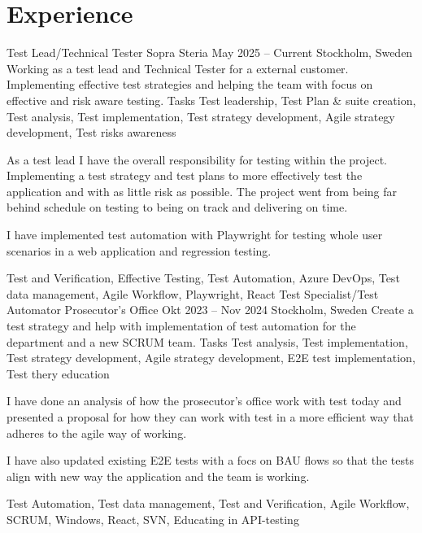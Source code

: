 \documentclass{sobCV}[2015/09/08]
\begin{document}
\section{Experience}

\experiencenode
{Test Lead/Technical Tester}
{Sopra Steria}
{May 2025 -- Current}
{Stockholm, Sweden}{
	Working as a test lead and Technical Tester for a external customer.
	Implementing effective test strategies and helping the team with focus
	on effective and risk aware testing.
}
{Tasks}{
	Test leadership,
	Test Plan \& suite creation,
	Test analysis,
	Test implementation,
	Test strategy development,
	Agile strategy development,
	Test risks awareness
}{  %
	{
		As a test lead I have the overall responsibility for testing within the
		project. Implementing a test strategy and test plans to more
		effectively test the application and with as little risk as possible.
		The project went from being far behind schedule on testing to being on
		track and delivering on time.

		I have implemented test automation with Playwright for testing whole
		user scenarios in a web application and regression testing.

	}
}{
	Test and Verification,
	Effective Testing,
	Test Automation,
	Azure DevOps,
	Test data management,
	Agile Workflow,
	Playwright,
	React
}
\experiencenode
{Test Specialist/Test Automator}
{Prosecutor's Office}
{Okt 2023 -- Nov 2024}
{Stockholm, Sweden}{
	Create a test strategy and help with implementation of test automation
	for the department and a new SCRUM team.
}
{Tasks}{
	Test analysis,
	Test implementation,
	Test strategy development,
	Agile strategy development,
	E2E test implementation,
	Test thery education
}{  %
	{
		I have done an analysis of how the prosecutor's office work with test
		today and presented a proposal for how they can work with test in a more
		efficient way that adheres to the agile way of working.

		I have also updated existing E2E tests with a focs on BAU flows so that
		the tests align with new way the application and the team is working.

	}
}{
	Test Automation,
	Test data management,
	Test and Verification,
	Agile Workflow,
	SCRUM,
	Windows,
	React,
	SVN,
	Educating in API-testing
}
\end{document}
